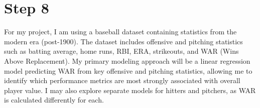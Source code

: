 \documentclass{article}
\begin{document}
\section*{Step 8}
For my project, I am using a baseball dataset containing statistics from the modern era (post-1900). The dataset includes offensive and pitching statistics such as batting average, home runs, RBI, ERA, strikeouts, and WAR (Wins Above Replacement). My primary modeling approach will be a linear regression model predicting WAR from key offensive and pitching statistics, allowing me to identify which performance metrics are most strongly associated with overall player value. I may also explore  separate models for hitters and pitchers, as WAR is calculated differently for each.
\end{document}
